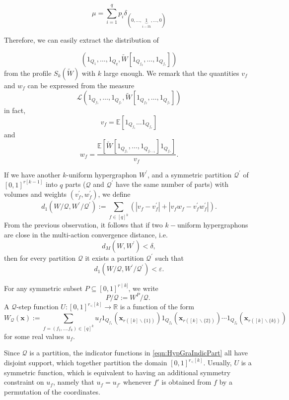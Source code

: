 \documentclass[11pt]{article}
\begin{document}
$$
\mu=\sum^q_{i=1}p_i\delta_{(0,\ldots,\underbrace{1}_{i-th},\ldots,0)} 
$$

Therefore, we can easily extract the distribution of  

$$( 1_{Q_{1}},\ldots,1_{Q_{q}},\widetilde{W}[1_{Q_{f_2}},\ldots,1_{Q_{f_{r}}}])$$
from the profile $S_k(\widetilde{W})$ with $k$ large enough.
We remark that the quantities $v_f$ and $w_f$ can be expressed from the measure 
$$\mathcal{L}( 1_{Q_{f_1}},\ldots,1_{Q_{f_{r}}},\widetilde{W}[1_{Q_{f_2}},\ldots,1_{Q_{f_{r}}}])$$
in fact, 
$$
v_f=\mathbb{E}[1_{Q_{f_1}}\ldots1_{Q_{f_{r}}}]
$$
and 
$$
w_f=\frac{\mathbb{E}[\widetilde{W}[1_{Q_{f_1}},\ldots,1_{Q_{f_{r-1}}}]1_{Q_{f_{r}}}]}{v_f}.
$$



If we have another $k$-uniform hypergraphon $W^{\prime}$, and a symmetric partition $\mathcal{Q}^{\prime}$ of $[0,1]^{r[k-1]}$ into $q$ parts ($\mathcal{Q}$ and $\mathcal{Q}^{\prime}$ have the same number of parts) with volumes and weights $\left(v_f^{\prime}, w_f^{\prime}\right)$, we define
$$
d_1\left(W / \mathcal{Q}, W^{\prime} / \mathcal{Q}^{\prime}\right):=\sum_{f \in[q]^k}\left(\left|v_f-v_f^{\prime}\right|+\left|v_f w_f-v_f^{\prime} w_f^{\prime}\right|\right) .
$$
From the previous observation, it follows that if two $k-$uniform hypergraphons are close in the multi-action convergence distance, i.e.\
$$
d_M(W,W^{\prime})<\delta,
$$
then for every partition $\mathcal{Q}$ it exists a partition $\mathcal{Q}^{\prime}$ such that 
$$
d_1\left(W / \mathcal{Q}, W^{\prime} / \mathcal{Q}^{\prime}\right)<\varepsilon.$$




For any symmetric subset $P \subseteq[0,1]^{r \mid k]}$, we write
$$
P / \mathcal{Q}:=W^P / \mathcal{Q} \text {. }
$$
A $\mathcal{Q}$-step function $U:[0,1]^{r_{<}[k]} \rightarrow \mathbb{R}$ is a function of the form
\begin{equation}\label{eqn:HypGraIndicPart}
W_{\mathcal{Q}}(\mathbf{x}):=\sum_{f=\left(f_1, \ldots . f_k\right) \in[q]^k} u_f 1_{Q_{f_1}}\left(\mathbf{x}_{r([k] \backslash\{1\})}\right) 1_{Q_{f_2}}\left(\mathbf{x}_{r([k] \backslash\{2\})}\right) \cdots 1_{Q_{f_k}}\left(\mathbf{x}_{r([k] \backslash\{k\})}\right)
\end{equation}
for some real values $u_f$. 

Since $\mathcal{Q}$ is a partition, the indicator functions in \eqref{eqn:HypGraIndicPart} all have disjoint support, which together partition the domain $[0,1]^{r_{<}[ k]}$. Usually, $U$ is a symmetric function, which is equivalent to having an additional symmetry constraint on $u_f$, namely that $u_f=u_{f'}$ whenever $f'$ is obtained from $f$ by a permutation of the coordinates.
\end{document}
